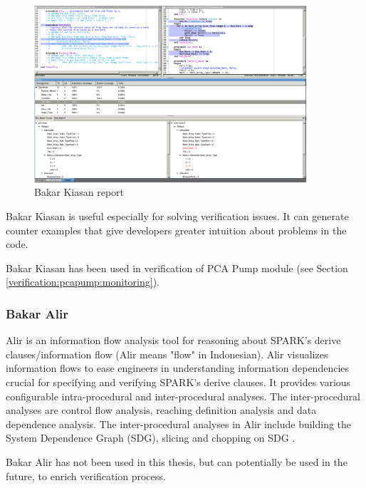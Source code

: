 \begin{figure}[ht]%
    \begin{center}
    	\includegraphics[width=0.9\textwidth]{figures/kiasan-sample.png}    	
    \end{center}
    \caption{Bakar Kiasan report}
    \label{figure:kiasan-sample}
\end{figure}

Bakar Kiasan is useful especially for solving verification issues. It can generate counter examples that give developers greater intuition about problems in the code.

Bakar Kiasan has been used in verification of PCA Pump module (see Section \ref{verification:pcapump:monitoring}).



\subsubsection{Bakar Alir}
Alir is an information flow analysis tool for reasoning about SPARK's derive clauses/information flow (Alir means "flow" in Indonesian). Alir visualizes information flows to ease engineers in understanding information dependencies crucial for specifying and verifying SPARK's derive clauses. It provides various configurable intra-procedural and inter-procedural analyses. The inter-procedural analyses are control flow analysis, reaching definition analysis and data dependence analysis. The inter-procedural analyses in Alir include building the System Dependence Graph (SDG), slicing and chopping on SDG \cite{Hari:Thesis}.

Bakar Alir has not been used in this thesis, but can potentially be used in the future, to enrich verification process.


